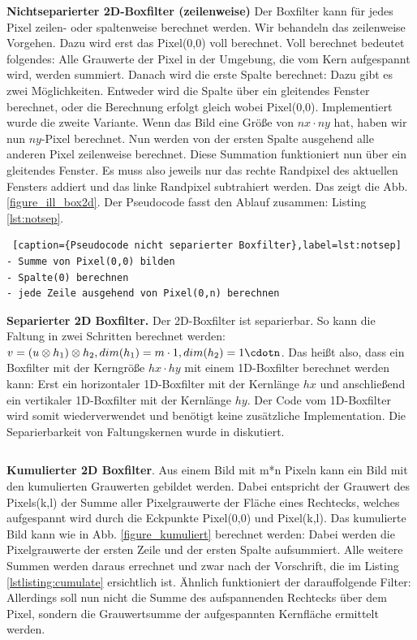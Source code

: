 \documentclass[a4paper,12pt]{article}
\begin{document}
\textbf{Nichtseparierter 2D-Boxfilter (zeilenweise)} 
Der Boxfilter kann für jedes Pixel zeilen- oder spaltenweise berechnet
werden. Wir behandeln das zeilenweise Vorgehen. Dazu wird erst das Pixel(0,0)
voll berechnet. Voll berechnet bedeutet folgendes: Alle Grauwerte der Pixel
in der Umgebung, die vom Kern aufgespannt wird, werden summiert. Danach wird die
erste Spalte berechnet: Dazu gibt es zwei Möglichkeiten. Entweder wird die
Spalte über ein gleitendes Fenster berechnet, oder die Berechnung erfolgt gleich
wobei Pixel(0,0). Implementiert wurde die zweite Variante. Wenn das Bild eine
Größe von $nx \cdot ny$ hat, haben wir nun $ny$-Pixel berechnet. Nun werden von
der ersten Spalte ausgehend alle anderen Pixel zeilenweise berechnet. Diese
Summation funktioniert nun über ein gleitendes Fenster. Es muss also jeweils
nur das rechte Randpixel des aktuellen Fensters addiert und das linke Randpixel
subtrahiert werden. Das zeigt die Abb. \ref{figure_ill_box2d}. Der Pseudocode
fasst den Ablauf zusammen: Listing \ref{lst:notsep}.

 
\begin{lstlisting} [caption={Pseudocode nicht separierter Boxfilter},label=lst:notsep] 
- Summe von Pixel(0,0) bilden
- Spalte(0) berechnen
- jede Zeile ausgehend von Pixel(0,n) berechnen
\end{lstlisting}



\textbf{Separierter 2D Boxfilter.} 
Der 2D-Boxfilter ist separierbar. So kann die
Faltung in zwei Schritten berechnet werden: $v = \left ( u \otimes h_{1} \right
) \otimes h_{2},dim(h_{1})=m\cdot1,dim(h_{2})=1\cdotn$.
Das heißt also, dass ein Boxfilter mit der Kerngröße $hx \cdot hy$ mit einem
1D-Boxfilter berechnet werden kann: Erst ein horizontaler 1D-Boxfilter mit der
Kernlänge $hx$ und anschließend ein vertikaler 1D-Boxfilter mit der Kernlänge
$hy$. Der Code vom 1D-Boxfilter wird somit wiederverwendet und benötigt keine
zusätzliche Implementation. Die Separierbarkeit von Faltungskernen wurde in
\cite{lehmann} diskutiert.




\begin{verbatim}
\end{verbatim}

 


\textbf{Kumulierter 2D Boxfilter}.
Aus einem Bild mit m*n Pixeln kann ein Bild mit den kumulierten Grauwerten
gebildet werden. Dabei entspricht der Grauwert des Pixels(k,l) der Summe aller
Pixelgrauwerte der Fläche eines Rechtecks, welches aufgespannt wird durch die
Eckpunkte Pixel(0,0) und Pixel(k,l).
Das kumulierte Bild kann wie in Abb. \ref{figure_kumuliert} berechnet werden:
Dabei werden die Pixelgrauwerte der ersten Zeile und der ersten Spalte
aufsummiert. Alle weitere Summen werden daraus errechnet und zwar nach der
Vorschrift, die im Listing \ref{lstlisting:cumulate} ersichtlich ist.
Ähnlich funktioniert der darauffolgende Filter:
Allerdings soll nun nicht die Summe des aufspannenden Rechtecks über dem Pixel,
sondern die Grauwertsumme der aufgespannten Kernfläche ermittelt werden.  
\end{document}
